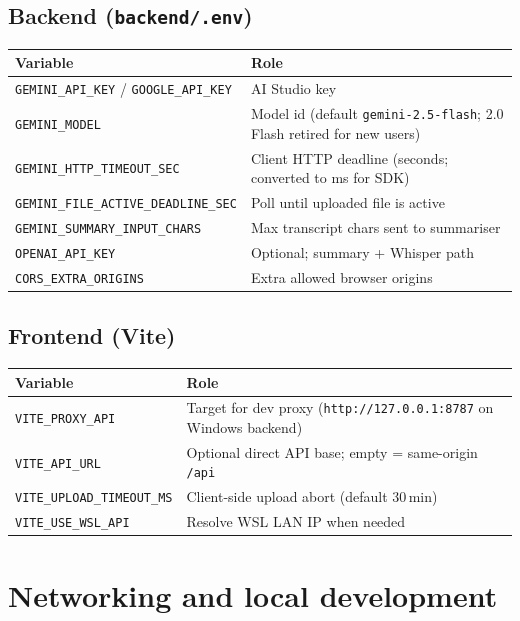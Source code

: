 \documentclass[11pt,a4paper]{article}
\begin{document}
\subsection{Backend (\texttt{backend/.env})}
\begin{tabularx}{\linewidth}{@{}lX@{}}
  \toprule
  \textbf{Variable} & \textbf{Role} \\
  \midrule
  \texttt{GEMINI\_API\_KEY} / \texttt{GOOGLE\_API\_KEY} & AI Studio key \\
  \texttt{GEMINI\_MODEL} & Model id (default \texttt{gemini-2.5-flash}; 2.0 Flash retired for new users) \\
  \texttt{GEMINI\_HTTP\_TIMEOUT\_SEC} & Client HTTP deadline (seconds; converted to ms for SDK) \\
  \texttt{GEMINI\_FILE\_ACTIVE\_DEADLINE\_SEC} & Poll until uploaded file is active \\
  \texttt{GEMINI\_SUMMARY\_INPUT\_CHARS} & Max transcript chars sent to summariser \\
  \texttt{OPENAI\_API\_KEY} & Optional; summary + Whisper path \\
  \texttt{CORS\_EXTRA\_ORIGINS} & Extra allowed browser origins \\
  \bottomrule
\end{tabularx}

\subsection{Frontend (Vite)}
\begin{tabularx}{\linewidth}{@{}lX@{}}
  \toprule
  \textbf{Variable} & \textbf{Role} \\
  \midrule
  \texttt{VITE\_PROXY\_API} & Target for dev proxy (\texttt{http://127.0.0.1:8787} on Windows backend) \\
  \texttt{VITE\_API\_URL} & Optional direct API base; empty = same-origin \texttt{/api} \\
  \texttt{VITE\_UPLOAD\_TIMEOUT\_MS} & Client-side upload abort (default 30\,min) \\
  \texttt{VITE\_USE\_WSL\_API} & Resolve WSL LAN IP when needed \\
  \bottomrule
\end{tabularx}

\section{Networking and local development}
\end{document}
